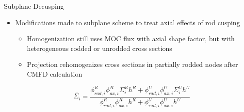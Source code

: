 \begin{frame}[t]{Subplane Decusping}
    
    \begin{itemize}
        \item Modifications made to subplane scheme \cite{Graham2017Improvementofthe2D/1DMethodUsingtheSub-PlaneScheme,Graham2017RodDecuspingTechniquesforthe2D/1DMethod} to treat axial effects of rod cusping
        \begin{itemize}
            \item Homogenization still uses MOC flux with axial shape factor, but 
            with heterogeneous rodded or unrodded cross sections
            \item Projection rehomogenizes cross sections in partially rodded nodes 
            after CMFD calculation
        \end{itemize}
        \begin{equation}\label{e:nTRACERdecusping}
        \overline{\Sigma_i} = \frac{\phi_{rad,i}^R \phi_{ax,i}^R \Sigma_i^R h^R + \phi_{rad,i}^U \phi_{ax,i}^U \Sigma_i^U h^U}{\phi_{rad,i}^R \phi_{ax,i}^R h^R + \phi_{rad,i}^U \phi_{ax,i}^U h^U} \nonumber
        \end{equation}
    \end{itemize}
    
\end{frame}


